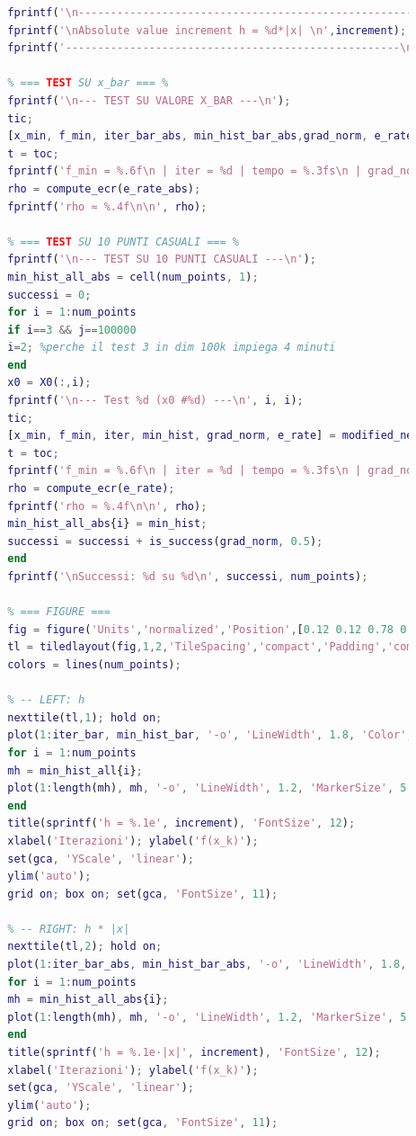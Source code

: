 \documentclass[a4paper,12pt]{article}
\begin{document}
\begin{lstlisting}[language=Matlab,caption={Full script: Modified Newton method on Banded Trigonometric},label={lst:rosenbrock-extended}]
		% Absolute value increment
		fprintf('\n----------------------------------------------------');
		fprintf('\nAbsolute value increment h = %d*|x| \n',increment);
		fprintf('----------------------------------------------------\n');
		
		% === TEST SU x_bar === %
		fprintf('\n--- TEST SU VALORE X_BAR ---\n');
		tic;
		[x_min, f_min, iter_bar_abs, min_hist_bar_abs,grad_norm, e_rate_abs] = modified_newton(banded_tr,grad_f,hess_f,x_bar,tol,max_iter,fd,increment,1);
		t = toc;
		fprintf('f_min = %.6f\n | iter = %d | tempo = %.3fs\n | grad_norm = %.6f\n', f_min, iter_bar_abs, t, grad_norm);
		rho = compute_ecr(e_rate_abs);
		fprintf('rho ≈ %.4f\n\n', rho);
		
		% === TEST SU 10 PUNTI CASUALI === %
		fprintf('\n--- TEST SU 10 PUNTI CASUALI ---\n');
		min_hist_all_abs = cell(num_points, 1);
		successi = 0;
		for i = 1:num_points
		if i==3 && j==100000
		i=2; %perche il test 3 in dim 100k impiega 4 minuti
		end
		x0 = X0(:,i);
		fprintf('\n--- Test %d (x0 #%d) ---\n', i, i);
		tic;
		[x_min, f_min, iter, min_hist, grad_norm, e_rate] = modified_newton(banded_tr,grad_f,hess_f,x0,tol,max_iter,fd,increment,1);
		t = toc;
		fprintf('f_min = %.6f\n | iter = %d | tempo = %.3fs\n | grad_norm = %.6f\n', f_min, iter, t, grad_norm);
		rho = compute_ecr(e_rate);
		fprintf('rho ≈ %.4f\n\n', rho);
		min_hist_all_abs{i} = min_hist;
		successi = successi + is_success(grad_norm, 0.5);
		end   
		fprintf('\nSuccessi: %d su %d\n', successi, num_points);
		
		% === FIGURE ===
		fig = figure('Units','normalized','Position',[0.12 0.12 0.78 0.62]);
		tl = tiledlayout(fig,1,2,'TileSpacing','compact','Padding','compact');
		colors = lines(num_points);
		
		% -- LEFT: h 
		nexttile(tl,1); hold on;
		plot(1:iter_bar, min_hist_bar, '-o', 'LineWidth', 1.8, 'Color', 'k', 'DisplayName', 'x̄');
		for i = 1:num_points
		mh = min_hist_all{i};
		plot(1:length(mh), mh, '-o', 'LineWidth', 1.2, 'MarkerSize', 5, 'Color', colors(i,:), 'DisplayName', sprintf('x₀ #%d', i));
		end
		title(sprintf('h = %.1e', increment), 'FontSize', 12);
		xlabel('Iterazioni'); ylabel('f(x_k)');
		set(gca, 'YScale', 'linear');
		ylim('auto');
		grid on; box on; set(gca, 'FontSize', 11);
		
		% -- RIGHT: h * |x|
		nexttile(tl,2); hold on;
		plot(1:iter_bar_abs, min_hist_bar_abs, '-o', 'LineWidth', 1.8, 'Color', 'k', 'DisplayName', 'x̄');
		for i = 1:num_points
		mh = min_hist_all_abs{i};
		plot(1:length(mh), mh, '-o', 'LineWidth', 1.2, 'MarkerSize', 5, 'Color', colors(i,:), 'DisplayName', sprintf('x₀ #%d', i));
		end
		title(sprintf('h = %.1e·|x|', increment), 'FontSize', 12);
		xlabel('Iterazioni'); ylabel('f(x_k)');
		set(gca, 'YScale', 'linear');
		ylim('auto');
		grid on; box on; set(gca, 'FontSize', 11);
		

\end{lstlisting}
\end{document}

